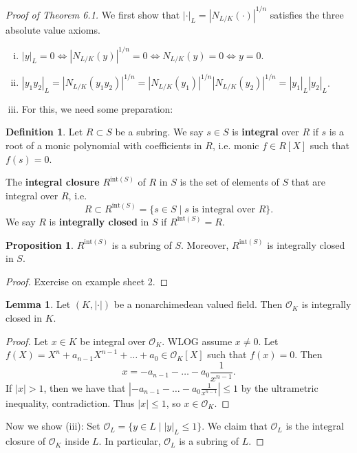 \documentclass{article}
\theoremstyle{definition}
\newtheorem{lemma}[theorem]{Lemma}
\newtheorem{prop}[theorem]{Proposition}
\newtheorem{defn}{Definition}[section]
\begin{document}
\begin{proof}[Proof of Theorem 6.1]
    We first show that $|\cdot|_L = |N_{L/K}(\cdot )|^{1/n}$ satisfies the three absolute value axioms.
    \begin{enumerate}[(i)]
        \item $|y|_L = 0 \iff |N_{L/K}(y)|^{1/n} = 0 \iff N_{L/K}(y) = 0 \iff y = 0$.
        \item $|y_1y_2|_L = |N_{L/K}(y_1y_2)|^{1/n} = |N_{L/K}(y_1)|^{1/n}|N_{L/K}(y_2)|^{1/n} = |y_1|_L|y_2|_L$.
        \item For this, we need some preparation:
    \end{enumerate}
    \begin{defn}
        Let $R \subset S$ be a subring. We say $s \in S$ is \textbf{integral} over $R$ if $s$ is a root of a monic polynomial with coefficients in $R$, i.e. monic $f \in R[X]$ such that $f(s)=0$.
        \vspace{1mm}
         
        The \textbf{integral closure} $R^{\text{int}(S)}$ of $R$ in $S$ is the set of elements of $S$ that are integral over $R$, i.e. \[
        R \subset R^{\text{int}(S)} = \{s \in S \mid s \text{ is integral over }R\}.
        \]
        We say $R$ is \textbf{integrally closed} in $S$ if $R^{\text{int}(S)} = R$.
    \end{defn}
    \begin{prop}
        $R^{\text{int}(S)}$ is a subring of $S$. Moreover, $R^{\text{int}(S)}$ is integrally closed in $S$.
    \end{prop}
    \begin{proof}
        Exercise on example sheet 2.
    \end{proof}
    \begin{lemma}\label{lemma6.5}
        Let $(K,|\cdot|)$ be a nonarchimedean valued field. Then $\mathcal{O}_K$ is integrally closed in $K$.
    \end{lemma}
    \begin{proof}
        Let $x \in K$ be integral over $\mathcal{O}_K$. WLOG assume $x \neq 0$. Let $f(X) = X^n + a_{n-1}X^{n-1}+\ldots+a_0 \in \mathcal{O}_K[X]$ such that $f(x)=0$. Then \[
        x = -a_{n-1} - \ldots - a_0 \frac{1}{x^{n-1}}.
        \] 
        If $|x|>1$, then we have that $\left|-a_{n-1}- \ldots - a_0\frac{1}{x^{n-1}}\right|\le 1$ by the ultrametric inequality, contradiction. Thus $|x| \le 1$, so $x \in \mathcal{O}_K$.
    \end{proof}
    Now we show (iii): Set $\mathcal{O}_L = \{y \in L \mid |y|_L \le 1\}$. We claim that $\mathcal{O}_L$ is the integral closure of $\mathcal{O}_K$ inside $L$. In particular, $\mathcal{O}_L$ is a subring of $L$. 
    \vspace{1mm}
     

\end{proof}
\end{document}
